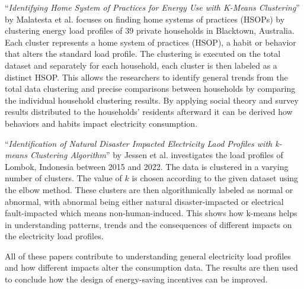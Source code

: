 \enquote{\textit{Identifying Home System of Practices for Energy Use with K-Means Clustering}} by Malatesta et al. \cite{MAL-HBP} focuses on finding home systems of practices (HSOPs) by clustering energy load profiles of 39 private households in Blacktown, Australia.
Each cluster represents a home system of practices (HSOP), a habit or behavior that alters the standard load profile.
The clustering is executed on the total dataset and separately for each household, each cluster is then labeled as a distinct HSOP.
This allows the researchers to identify general trends from the total data clustering and precise comparisons between households by comparing the individual household clustering results.
By applying social theory and survey results distributed to the households' residents afterward it can be derived how behaviors and habits impact electricity consumption.

\enquote{\textit{Identification of Natural Disaster Impacted Electricity Laod Profiles with k-means Clustering Algorithm}} by Jessen et al. \cite{JES-IND} investigates the load profiles of Lombok, Indonesia between 2015 and 2022.
The data is clustered in a varying number of clusters.
The value of $k$ is chosen according to the given dataset using the elbow method.
These clusters are then algorithmically labeled as normal or abnormal, with abnormal being either natural disaster-impacted or electrical fault-impacted which means non-human-induced.
This shows how k-means helps in understanding patterns, trends and the consequences of different impacts on the electricity load profiles.

All of these papers contribute to understanding general electricity load profiles and how different impacts alter the consumption data.
The results are then used to conclude how the design of energy-saving incentives can be improved.
